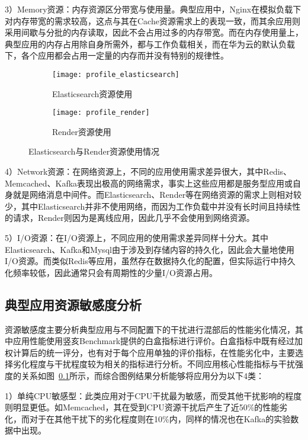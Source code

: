3）Memory资源：内存资源区分带宽与使用量。典型应用中，Nginx在模拟负载下对内存带宽的需求较高，这点与其在Cache资源需求上的表现一致，而其余应用则采用间歇与分批的内存读取，因此不会占用过多的内存带宽。而在内存使用量上，典型应用的内存占用除自身所需外，都与工作负载相关，而在华为云的默认负载下，各个应用都会占用一定量的内存而并没有特别的规律性。

\begin{figure}[H]
    \centering
    \begin{subfigure}[b]{0.9\textwidth}
      \texttt{[image: profile\_elasticsearch]}
      \caption{Elasticsearch资源使用}
      \label{fig:profile_elasticsearch}
    \end{subfigure}
    \begin{subfigure}[b]{0.9\textwidth}
        \texttt{[image: profile\_render]}
        \caption{Render资源使用}
        \label{fig:profile_render}
    \end{subfigure}
\label{fig:resource_affinity_2}
\caption{Elasticsearch与Render资源使用情况}
\end{figure}

4）Network资源：在网络资源上，不同的应用使用需求差异很大，其中Redis、Memcached、Kafka表现出极高的网络需求，事实上这些应用都是服务型应用或自身就是网络消息中间件。而Elasticsearch、Render等在网络资源的需求上则相对较少，其中Elasticsearch并非不使用网络，而因为工作负载中并没有长时间且持续性的请求，Render则因为是离线应用，因此几乎不会使用到网络资源。

5）I/O资源：在I/O资源上，不同应用的使用需求差异同样十分大。其中Elasticsearch、Kafka和Mysql由于涉及到存储内容的持久化，因此会大量地使用I/O资源。而类似Redis等应用，虽然存在数据持久化的配置，但实际运行中持久化频率较低，因此通常只会有周期性的少量I/O资源占用。

\subsection{典型应用资源敏感度分析}

资源敏感度主要分析典型应用与不同配置下的干扰进行混部后的性能劣化情况，其中应用性能使用竖亥Benchmark提供的白盒指标进行评价。白盒指标中既有经过加权计算后的统一评分，也有对于每个应用单独的评价指标，在性能劣化中，主要选择劣化程度与干扰程度较为相关的指标进行分析。不同应用核心性能指标与干扰强度的关系如图~\ref{}所示，而综合图例结果分析能够将应用分为以下4类：

1）单纯CPU敏感型：此类应用对于CPU干扰最为敏感，而受其他干扰影响的程度则明显更低。如Memcached，其在受到CPU资源干扰后产生了近50\%的性能劣化，而对于在其他干扰下的劣化程度则在10\%内，同样的情况也在Kafka的实验数据中出现。

